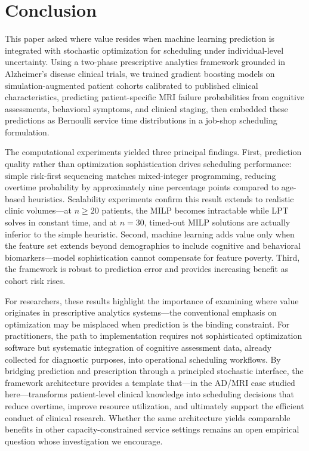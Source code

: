 \documentclass[11pt,a4paper]{article}
\begin{document}

\section{Conclusion}
\label{sec:conclusion}

This paper asked where value resides when machine learning prediction is integrated with stochastic optimization for scheduling under individual-level uncertainty. Using a two-phase prescriptive analytics framework grounded in Alzheimer's disease clinical trials, we trained gradient boosting models on simulation-augmented patient cohorts calibrated to published clinical characteristics, predicting patient-specific MRI failure probabilities from cognitive assessments, behavioral symptoms, and clinical staging, then embedded these predictions as Bernoulli service time distributions in a job-shop scheduling formulation.

The computational experiments yielded three principal findings. First, prediction quality rather than optimization sophistication drives scheduling performance: simple risk-first sequencing matches mixed-integer programming, reducing overtime probability by approximately nine percentage points compared to age-based heuristics. Scalability experiments confirm this result extends to realistic clinic volumes---at $n \geq 20$ patients, the MILP becomes intractable while LPT solves in constant time, and at $n = 30$, timed-out MILP solutions are actually inferior to the simple heuristic. Second, machine learning adds value only when the feature set extends beyond demographics to include cognitive and behavioral biomarkers---model sophistication cannot compensate for feature poverty. Third, the framework is robust to prediction error and provides increasing benefit as cohort risk rises.

For researchers, these results highlight the importance of examining where value originates in prescriptive analytics systems---the conventional emphasis on optimization may be misplaced when prediction is the binding constraint. For practitioners, the path to implementation requires not sophisticated optimization software but systematic integration of cognitive assessment data, already collected for diagnostic purposes, into operational scheduling workflows. By bridging prediction and prescription through a principled stochastic interface, the framework architecture provides a template that---in the AD/MRI case studied here---transforms patient-level clinical knowledge into scheduling decisions that reduce overtime, improve resource utilization, and ultimately support the efficient conduct of clinical research. Whether the same architecture yields comparable benefits in other capacity-constrained service settings remains an open empirical question whose investigation we encourage.
\end{document}
